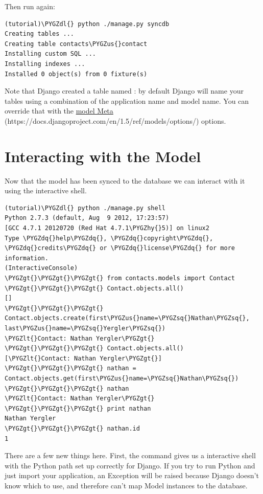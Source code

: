\documentclass[letterpaper,10pt,english]{sphinxmanual}
\def\PYGZus{\char`\_}
\def\PYGZlt{\char`\<}
\def\PYGZgt{\char`\>}
\def\PYGZdl{\char`\$}
\def\PYGZhy{\char`\-}
\def\PYGZsq{\char`\'}
\def\PYGZdq{\char`\"}
\renewcommand\PYGZsq{\textquotesingle}
\begin{document}
Then run  again:

\begin{Verbatim}[commandchars=\\\{\}]
(tutorial)\PYGZdl{} python ./manage.py syncdb
Creating tables ...
Creating table contacts\PYGZus{}contact
Installing custom SQL ...
Installing indexes ...
Installed 0 object(s) from 0 fixture(s)
\end{Verbatim}

Note that Django created a table named : by
default Django will name your tables using a combination of the
application name and model name. You can override that with the
\href{https://docs.djangoproject.com/en/1.5/ref/models/options/}{model Meta} (https://docs.djangoproject.com/en/1.5/ref/models/options/) options.


\section{Interacting with the Model}
\label{tutorial/models:interacting-with-the-model}
Now that the model has been synced to the database we can interact
with it using the interactive shell.

\begin{Verbatim}[commandchars=\\\{\}]
(tutorial)\PYGZdl{} python ./manage.py shell
Python 2.7.3 (default, Aug  9 2012, 17:23:57)
[GCC 4.7.1 20120720 (Red Hat 4.7.1\PYGZhy{}5)] on linux2
Type \PYGZdq{}help\PYGZdq{}, \PYGZdq{}copyright\PYGZdq{}, \PYGZdq{}credits\PYGZdq{} or \PYGZdq{}license\PYGZdq{} for more information.
(InteractiveConsole)
\PYGZgt{}\PYGZgt{}\PYGZgt{} from contacts.models import Contact
\PYGZgt{}\PYGZgt{}\PYGZgt{} Contact.objects.all()
[]
\PYGZgt{}\PYGZgt{}\PYGZgt{} Contact.objects.create(first\PYGZus{}name=\PYGZsq{}Nathan\PYGZsq{}, last\PYGZus{}name=\PYGZsq{}Yergler\PYGZsq{})
\PYGZlt{}Contact: Nathan Yergler\PYGZgt{}
\PYGZgt{}\PYGZgt{}\PYGZgt{} Contact.objects.all()
[\PYGZlt{}Contact: Nathan Yergler\PYGZgt{}]
\PYGZgt{}\PYGZgt{}\PYGZgt{} nathan = Contact.objects.get(first\PYGZus{}name=\PYGZsq{}Nathan\PYGZsq{})
\PYGZgt{}\PYGZgt{}\PYGZgt{} nathan
\PYGZlt{}Contact: Nathan Yergler\PYGZgt{}
\PYGZgt{}\PYGZgt{}\PYGZgt{} print nathan
Nathan Yergler
\PYGZgt{}\PYGZgt{}\PYGZgt{} nathan.id
1
\end{Verbatim}

There are a few new things here. First, the 
command gives us a interactive shell with the Python path set up
correctly for Django. If you try to run Python and just import your
application, an Exception will be raised because Django doesn't know
which  to use, and therefore can't map Model instances to
the database.
\end{document}
